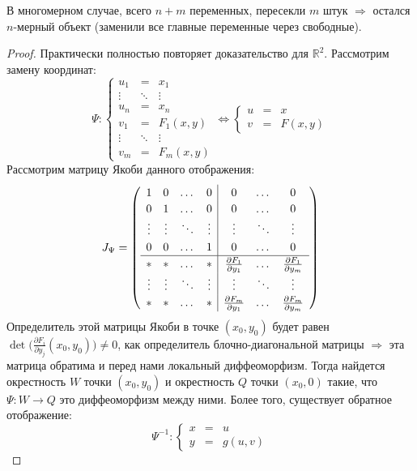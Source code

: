 \documentclass[12pt]{article}
\newcommand{\MR}{\mathbb{R}}
\theoremstyle{definition}
\begin{document}
В многомерном случае, всего $n + m$ переменных, пересекли $m$ штук $\Rightarrow$ остался $n$-мерный объект (заменили все главные переменные через свободные).
\begin{proof}
	Практически полностью повторяет доказательство для $\MR^2$. Рассмотрим замену координат:
	$$
		\Psi \colon \left\{
		\begin{array}{ccc}
			u_1& = &x_1 \\
			\vdots & \ddots & \vdots \\
			u_n& = &x_n \\
			v_1& = &F_1(x,y) \\
			\vdots & \ddots & \vdots \\
			v_m& = &F_m(x,y)
		\end{array}\right. \Leftrightarrow  
		\left\{
		\begin{array}{lcl}
			u& = &x \\
			v& = &F(x,y)
		\end{array}\right.
	$$
	Рассмотрим матрицу Якоби данного отображения:
	$$
		J_\Psi =	
		\left(
		\renewcommand\arraystretch{1.2}
		\begin{array}{cccc|ccc}
			1 & 0 & \dotsc & 0 & 0 & \dotsc & 0 \\
			0 & 1 & \dotsc & 0 & 0 & \dotsc & 0 \\
			\vdots & \vdots & \ddots & \vdots & \vdots & \ddots & \vdots \\
			0 & 0 & \dotsc & 1 & 0 & \dotsc & 0  \\
			\hline
			* & * & \dotsc & * & \tfrac{\partial F_1}{\partial y_1} & \dotsc & \tfrac{\partial F_1}{\partial y_m} \\
			\vdots & \vdots & \ddots & \vdots & \vdots & \ddots & \vdots \\
			* & * & \dotsc & * & \tfrac{\partial F_m}{\partial y_1} & \dotsc & \tfrac{\partial F_m}{\partial y_m} 
		\end{array}
		\right)
	$$
	Определитель этой матрицы Якоби в точке $(x_0,y_0)$ будет равен $\det{\big(\tfrac{\partial F_i}{\partial y_j}(x_0,y_0)\big)} \neq 0$, как определитель блочно-диагональной матрицы $\Rightarrow$ эта матрица обратима и перед нами локальный диффеоморфизм. Тогда найдется окрестность $W$ точки $(x_0, y_0)$ и окрестность $Q$ точки $(x_0, 0)$ такие, что $\Psi \colon W \to Q$ это диффеоморфизм между ними. Более того, существует обратное отображение:
	$$
		\Psi^{-1} \colon 
		\left\{
		\begin{array}{lcl}
			x& = &u \\
			y& = &g(u,v)
		\end{array}
$$
\end{proof}
\end{document}
